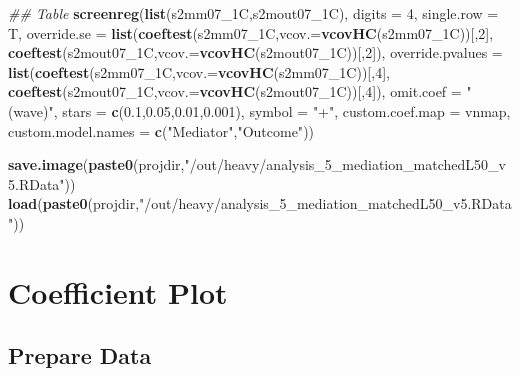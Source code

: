 \documentclass[
]{article}
\newenvironment{Shaded}{\begin{snugshade}}{\end{snugshade}}
\newcommand{\CommentTok}[1]{\textcolor[rgb]{0.56,0.35,0.01}{\textit{#1}}}
\newcommand{\DataTypeTok}[1]{\textcolor[rgb]{0.13,0.29,0.53}{#1}}
\newcommand{\DecValTok}[1]{\textcolor[rgb]{0.00,0.00,0.81}{#1}}
\newcommand{\FloatTok}[1]{\textcolor[rgb]{0.00,0.00,0.81}{#1}}
\newcommand{\KeywordTok}[1]{\textcolor[rgb]{0.13,0.29,0.53}{\textbf{#1}}}
\newcommand{\NormalTok}[1]{#1}
\newcommand{\StringTok}[1]{\textcolor[rgb]{0.31,0.60,0.02}{#1}}
\begin{document}
\begin{Shaded}
\begin{Highlighting}[]
\CommentTok{## Table}
\KeywordTok{screenreg}\NormalTok{(}\KeywordTok{list}\NormalTok{(s2mm07_1C,s2mout07_1C), }\DataTypeTok{digits =} \DecValTok{4}\NormalTok{, }\DataTypeTok{single.row =}\NormalTok{ T,}
          \DataTypeTok{override.se =} \KeywordTok{list}\NormalTok{(}\KeywordTok{coeftest}\NormalTok{(s2mm07_1C,}\DataTypeTok{vcov.=}\KeywordTok{vcovHC}\NormalTok{(s2mm07_1C))[,}\DecValTok{2}\NormalTok{],}
                             \KeywordTok{coeftest}\NormalTok{(s2mout07_1C,}\DataTypeTok{vcov.=}\KeywordTok{vcovHC}\NormalTok{(s2mout07_1C))[,}\DecValTok{2}\NormalTok{]),}
          \DataTypeTok{override.pvalues =} \KeywordTok{list}\NormalTok{(}\KeywordTok{coeftest}\NormalTok{(s2mm07_1C,}\DataTypeTok{vcov.=}\KeywordTok{vcovHC}\NormalTok{(s2mm07_1C))[,}\DecValTok{4}\NormalTok{],}
                                  \KeywordTok{coeftest}\NormalTok{(s2mout07_1C,}\DataTypeTok{vcov.=}\KeywordTok{vcovHC}\NormalTok{(s2mout07_1C))[,}\DecValTok{4}\NormalTok{]),}
          \DataTypeTok{omit.coef =} \StringTok{"(wave)"}\NormalTok{, }\DataTypeTok{stars =} \KeywordTok{c}\NormalTok{(}\FloatTok{0.1}\NormalTok{,}\FloatTok{0.05}\NormalTok{,}\FloatTok{0.01}\NormalTok{,}\FloatTok{0.001}\NormalTok{), }\DataTypeTok{symbol =} \StringTok{"+"}\NormalTok{,}
          \DataTypeTok{custom.coef.map =}\NormalTok{ vnmap, }
          \DataTypeTok{custom.model.names =} \KeywordTok{c}\NormalTok{(}\StringTok{"Mediator"}\NormalTok{,}\StringTok{"Outcome"}\NormalTok{))}
\end{Highlighting}
\end{Shaded}

\begin{Shaded}
\begin{Highlighting}[]
\KeywordTok{save.image}\NormalTok{(}\KeywordTok{paste0}\NormalTok{(projdir,}\StringTok{"/out/heavy/analysis_5_mediation_matchedL50_v5.RData"}\NormalTok{))}
\KeywordTok{load}\NormalTok{(}\KeywordTok{paste0}\NormalTok{(projdir,}\StringTok{"/out/heavy/analysis_5_mediation_matchedL50_v5.RData"}\NormalTok{))}
\end{Highlighting}
\end{Shaded}

\hypertarget{coefficient-plot}{%
\section{Coefficient Plot}\label{coefficient-plot}}

\hypertarget{prepare-data}{%
\subsection{Prepare Data}\label{prepare-data}}
\end{document}
